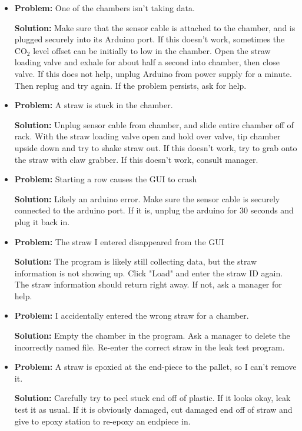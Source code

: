 \documentclass[A4,12pt]{article}
\begin{document}
\begin{itemize}
	\item {\bf Problem:} One of the chambers isn't taking data.
		\begin{adjustwidth}{1cm}{}
		{\bf Solution:} Make sure that the sensor cable is attached to the chamber, and is plugged securely into its Arduino port. If this doesn't work, sometimes the CO$_2$ level offset can be initially to low in the chamber. Open the straw loading valve and exhale for about half a second into chamber, then close valve. If this does not help, unplug Arduino from power supply for a minute. Then replug and try again. If the problem persists, ask for help.
		\end{adjustwidth}
\item {\bf Problem:} A straw is stuck in the chamber.
		\begin{adjustwidth}{1cm}{}
		{\bf Solution:} Unplug sensor cable from chamber, and slide entire chamber off of rack. With the straw loading valve open and hold over valve, tip chamber upside down and try to shake straw out. If this doesn't work, try to grab onto the straw with claw grabber. If this doesn't work, consult manager.
		\end{adjustwidth}
        \item {\bf Problem:} Starting a row causes the GUI to crash
		\begin{adjustwidth}{1cm}{}
		{\bf Solution:} Likely an arduino error.  Make sure the sensor cable is securely connected to the arduino port.  If it is, unplug the arduino for 30 seconds and plug it back in.
		\end{adjustwidth}
        \item {\bf Problem:} The straw I entered disappeared from the GUI
		\begin{adjustwidth}{1cm}{}
		{\bf Solution:} The program is likely still collecting data, but the straw information is not showing up.  Click "Load" and enter the straw ID again.  The straw information should return right away.  If not, ask a manager for help.
		\end{adjustwidth}
	\item {\bf Problem:} I accidentally entered the wrong straw for a chamber.
		\begin{adjustwidth}{1cm}{}
		{\bf Solution:} Empty the chamber in the program. Ask a manager to delete the incorrectly named file. Re-enter the correct straw in the leak test program.
		\end{adjustwidth}
\item {\bf Problem:} A straw is epoxied at the end-piece to the pallet, so I can't remove it.
		\begin{adjustwidth}{1cm}{}
		{\bf Solution:} Carefully try to peel stuck end off of plastic. If it looks okay, leak test it as usual. If it is obviously damaged, cut damaged end off of straw and give to epoxy station to re-epoxy an endpiece in.
		\end{adjustwidth}
		

\end{itemize}
\end{document}
